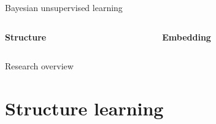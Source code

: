 \documentclass[10pt, compress]{beamer}
\begin{document}
\begin{frame}{Bayesian unsupervised learning}
  \centering
  \begin{columns}[T]
    \begin{column}{0.5\textwidth}
      \begin{overlayarea}{\textwidth}{7cm}
        \begin{center}
          \Large \textbf{Structure}\\ \vspace{10pt}
        \end{center}
      \end{overlayarea}
    \end{column}
    \begin{column}{0.5\textwidth}
      \begin{overlayarea}{\textwidth}{5cm}
        \centering
        \Large \textbf{Embedding} \\ \vspace{60pt}
      \end{overlayarea}
    \end{column}
  \end{columns}
\end{frame}

\begin{frame}{Research overview}
  \centering
\end{frame}

\section{Structure learning}
\end{document}
